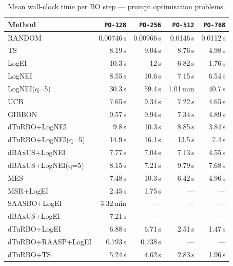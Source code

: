 \begin{table}[h]
  \centering
  \footnotesize
  \caption{Mean wall-clock time per BO step --- prompt optimisation problems.}
  \label{tab:wall_clock_po}
  \begin{tabular}{lrrrr}
    \toprule
    \textbf{Method} & \textbf{\texttt{PO-128}} & \textbf{\texttt{PO-256}} & \textbf{\texttt{PO-512}} & \textbf{\texttt{PO-768}} \\
    \midrule
    RANDOM & 0.00746\,s & 0.00966\,s & 0.0146\,s & 0.0112\,s \\
    TS & 8.19\,s & 9.04\,s & 8.76\,s & 4.98\,s \\
    LogEI & 10.3\,s & 12\,s & 6.82\,s & 1.76\,s \\
    LogNEI & 8.55\,s & 10.6\,s & 7.15\,s & 6.54\,s \\
    LogNEI(q=5) & 30.3\,s & 59.4\,s & 1.01\,min & 40.7\,s \\
    UCB & 7.65\,s & 9.34\,s & 7.22\,s & 4.65\,s \\
    GIBBON & 9.57\,s & 9.94\,s & 7.34\,s & 4.89\,s \\
    dTuRBO+LogNEI & 9.8\,s & 10.3\,s & 8.85\,s & 3.84\,s \\
    dTuRBO+LogNEI(q=5) & 14.9\,s & 16.1\,s & 13.5\,s & 7.4\,s \\
    dBAxUS+LogNEI & 7.77\,s & 7.04\,s & 7.13\,s & 4.55\,s \\
    dBAxUS+LogNEI(q=5) & 8.15\,s & 7.21\,s & 9.79\,s & 7.68\,s \\
    MES & 7.48\,s & 10.3\,s & 6.42\,s & 4.96\,s \\
    MSR+LogEI & 2.45\,s & 1.75\,s & --- & --- \\
    SAASBO+LogEI & 3.32\,min & --- & --- & --- \\
    dBAxUS+LogEI & 7.21\,s & --- & --- & --- \\
    dTuRBO+LogEI & 6.88\,s & 6.71\,s & 2.51\,s & 1.47\,s \\
    dTuRBO+RAASP+LogEI & 0.793\,s & 0.738\,s & --- & --- \\
    dTuRBO+TS & 5.24\,s & 4.62\,s & 2.83\,s & 1.96\,s \\
    \bottomrule
  \end{tabular}
\end{table}
